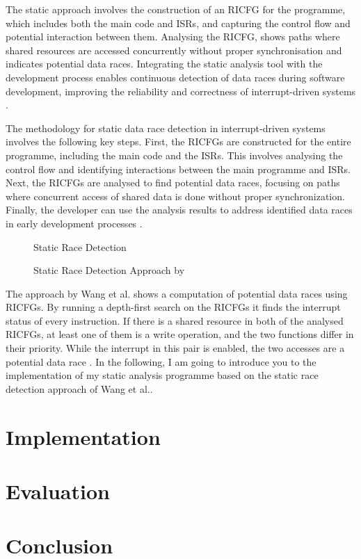 \documentclass[
fancyheadings, %
%
%
]{stsreprt}
\begin{document}
{		The static approach involves the construction of an RICFG for the programme, which includes both the main code and ISRs, and capturing the control flow and potential interaction between them. Analysing the RICFG, shows paths where shared resources are accessed concurrently without proper synchronisation and indicates potential data races. Integrating the static analysis tool with the development process enables continuous detection of data races during software development, improving the reliability and correctness of interrupt-driven systems \cite{wang2020}.
		
		The methodology for static data race detection in interrupt-driven systems involves the following key steps. First, the RICFGs are constructed for the entire programme, including the main code and the ISRs. This involves analysing the control flow and identifying interactions between the main programme and ISRs. Next, the RICFGs are analysed to find potential data races, focusing on paths where concurrent access of shared data is done without proper synchronization. Finally, the developer can use the analysis results to address identified data races in early development processes \cite{wang2020}.
		
		\begin{figure}[H]
			\begin{algorithm}[H]
				\caption{Static Race Detection}
				
				\BlankLine
			\end{algorithm}
			\caption{Static Race Detection Approach by \cite{wang2020}}
		\end{figure}
		
		The approach by Wang et al. shows a computation of potential data races using RICFGs. By running a depth-first search on the RICFGs it finds the interrupt status of every instruction. If there is a shared resource in both of the analysed RICFGs, at least one of them is a write operation, and the two functions differ in their priority. While the interrupt in this pair is enabled, the two accesses are a potential data race \cite{wang2020}.
		In the following, I am going to introduce you to the implementation of my static analysis programme based on the static race detection approach of Wang et al..
		
		
		\chapter{Implementation}
		\chapter{Evaluation}
		\chapter{Conclusion}
		\appendix
	}
\end{document}
